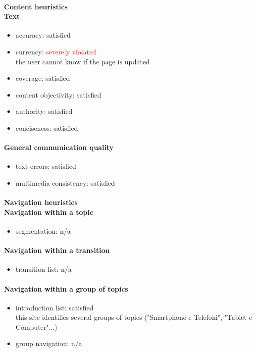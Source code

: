 \begin{enumerate}
	\paragraph*{Content heuristics \\ Text}
	\begin{itemize}
		\item accuracy: satisfied
		\item currency: \textcolor{red}{severely violated}\\the user cannot know if the page is updated
		\item coverage: satisfied
		\item content objectivity: satisfied
		\item authority: satisfied
		\item conciseness: satisfied		
	\end{itemize}

	\paragraph*{General communication quality}
	\begin{itemize}
		\item text errors: satisfied
		\item multimedia consistency: satisfied
	\end{itemize}

	\paragraph*{Navigation heuristics \\ Navigation within a topic}
	\begin{itemize}
		\item segmentation: n/a
	\end{itemize}	
	
	\paragraph*{Navigation within a transition}
	\begin{itemize}
		\item transition list: n/a
	\end{itemize}
	
	\paragraph*{Navigation within a group of topics}
	\begin{itemize}
		\item introduction list: satisfied\\
		this site identifies several groups of topics ("Smartphone e Telefoni", "Tablet e Computer"...)
		\item group navigation: n/a
	\end{itemize}


\end{enumerate}
